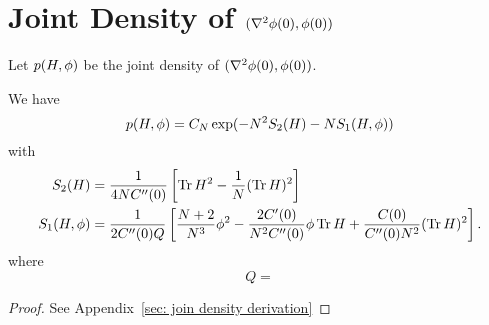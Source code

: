 \section{Joint Density of \((\nabla^2\phi(0), \phi(0))\)}

Let \(p(H, \phi)\) be the joint density of \((\nabla^2\phi(0), \phi(0))\). 

\begin{lemma}
	We have
	\[
		p(H, \phi) = C_N \exp(-N^2 S_2(H) - N S_1(H, \phi))
	\]
	with
	\begin{align*}
		S_2(H)
		&= \frac{1}{4NC''(0)}\left[
			\operatorname{Tr} H^2 - \frac1{N}(\operatorname{Tr} H)^2
		\right]
		\\
		S_1(H,\phi)
		&= \frac1{2C''(0)Q}\left[
			\frac{N+2}{N^3}\phi^2
			- \frac{2C'(0)}{N^2C''(0)}\phi\operatorname{Tr} H
			+ \frac{C(0)}{C''(0)N^2}(\operatorname{Tr} H)^2
		\right].
	\end{align*}
	where
	\[
		Q = 
	\]
\end{lemma}
\begin{proof}
	See Appendix~\ref{sec: join density derivation}
\end{proof}